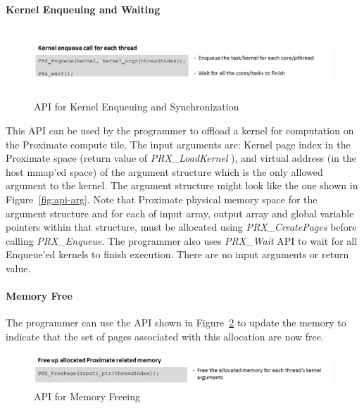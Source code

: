 \paragraph{Kernel Enqueuing and Waiting}

\begin{figure}[h]
  \begin{center}
    \includegraphics[width=\linewidth,height=1in]{cs758-figs/api-q.png}
  \end{center}
\vspace{-0.2in}
  \caption{API for Kernel Enqueuing and Synchronization}
  \label{fig:api-q}
\vspace{-0.05in}
\end{figure}

This API can be used by the programmer to offload a kernel for computation on the Proximate compute tile. 
The input arguments are: Kernel page index in the Proximate space (return value of \emph{PRX\_LoadKernel} ), and
virtual address (in the host mmap’ed space) of the argument structure which is the only allowed argument to the kernel. 
The argument structure might look like the one shown in Figure~\ref{fig:api-arg}. 
Note that Proximate physical memory space for the argument structure and for each of input array, 
output array and global variable pointers within that structure, must be allocated using \emph{PRX\_CreatePages} before calling \emph{PRX\_Enqueue}.
The programmer also uses \emph{PRX\_Wait} API to wait for all Enqueue’ed kernels to finish execution. There are no input arguments or return value.


\paragraph{Memory Free}

The programmer can use the API shown in Figure~\ref{fig:api-free} to update the memory to indicate that the set of pages associated with this allocation are now free.
\begin{figure}[h]
  \begin{center}
    \includegraphics[width=\linewidth]{cs758-figs/api-free.png}
  \end{center}
\vspace{-0.2in}
  \caption{API for Memory Freeing}
  \label{fig:api-free}
\vspace{-0.05in}
\end{figure}

